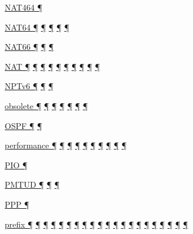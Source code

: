 \documentclass[
]{article}
\begin{document}
\hyperref[translation-and-ipv4-as-a-service]{NAT464 ¶}

\hyperref[dual-stack-scenarios]{NAT64 ¶}
\hyperref[obsolete-techniques]{¶}
\hyperref[translation-and-ipv4-as-a-service]{¶}
\hyperref[advanced-troubleshooting]{¶} \hyperref[tools]{¶}

\hyperref[ipv6-primary-differences-from-ipv4]{NAT66 ¶}
\hyperref[translation-and-ipv4-as-a-service]{¶} \hyperref[security]{¶}

\hyperref[transport-protocols]{NAT ¶} \hyperref[dual-stack-scenarios]{¶}
\hyperref[obsolete-techniques]{¶}
\hyperref[translation-and-ipv4-as-a-service]{¶} \hyperref[tunnels]{¶}
\hyperref[security]{¶} \hyperref[topology-obfuscation]{¶}
\hyperref[address-planning]{¶} \hyperref[multihoming]{¶}
\hyperref[deployment-in-the-enterprise]{¶}

\hyperref[translation-and-ipv4-as-a-service]{NPTv6 ¶}
\hyperref[security]{¶} \hyperref[multihoming]{¶}

\hyperref[how-to-keep-up-to-date]{obsolete ¶} \hyperref[addresses]{¶}
\hyperref[dns]{¶} \hyperref[obsolete-techniques]{¶}
\hyperref[tunnels]{¶} \hyperref[obsolete-features-in-ipv6]{¶}
\hyperref[further-reading]{¶}

\hyperref[routing]{OSPF ¶} \hyperref[routing-operation]{¶}

\hyperref[dual-stack-scenarios]{performance ¶}
\hyperref[ipv6-primary-differences-from-ipv4]{¶} \hyperref[filtering]{¶}
\hyperref[network-design]{¶} \hyperref[management-and-operations]{¶}
\hyperref[multihoming]{¶} \hyperref[packet-size-and-jumbo-frames]{¶}
\hyperref[troubleshooting]{¶} \hyperref[advanced-troubleshooting]{¶}
\hyperref[tools]{¶}

\hyperref[auto-configuration]{PIO ¶}

\hyperref[extension-headers-and-options]{PMTUD ¶}
\hyperref[filtering]{¶} \hyperref[packet-size-and-jumbo-frames]{¶}

\hyperref[layer-2-functions]{PPP ¶}

\hyperref[addresses]{prefix ¶} \hyperref[auto-configuration]{¶}
\hyperref[managed-configuration]{¶} \hyperref[routing]{¶}
\hyperref[source-and-destination-address-selection]{¶}
\hyperref[dual-stack-scenarios]{¶}
\hyperref[ipv6-primary-differences-from-ipv4]{¶}
\hyperref[translation-and-ipv4-as-a-service]{¶} \hyperref[tunnels]{¶}
\hyperref[security]{¶} \hyperref[filtering]{¶}
\hyperref[layer-2-considerations]{¶} \hyperref[topology-obfuscation]{¶}
\hyperref[network-design]{¶} \hyperref[address-planning]{¶}
\hyperref[prefix-per-host]{¶}
\hyperref[address-and-prefix-management]{¶}
\hyperref[multi-prefix-operation]{¶} \hyperref[multihoming]{¶}
\hyperref[advanced-troubleshooting]{¶}
\hyperref[obsolete-features-in-ipv6]{¶}
\end{document}
